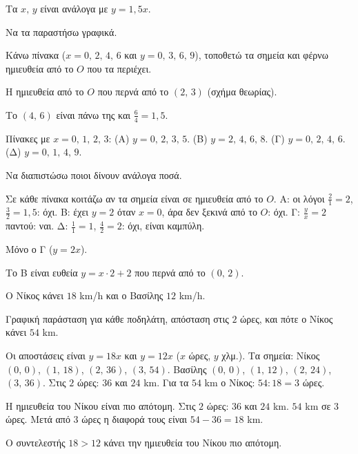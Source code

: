 
\tixero Τα $x,\,y$ είναι ανάλογα με $y=1{,}5x$.\par
\tithelo Να τα παραστήσω γραφικά.\par
\possindeo Κάνω πίνακα ($x=0,\,2,\,4,\,6$ και $y=0,\,3,\,6,\,9$), τοποθετώ τα σημεία και φέρνω ημιευθεία από το $O$ που τα περιέχει.\par
\apantisi Η ημιευθεία από το $O$ που περνά από το $(2,\,3)$ (σχήμα θεωρίας).\par
\elegxos Το $(4,\,6)$ είναι πάνω της και $\frac{6}{4}=1{,}5$.

\tixero Πίνακες με $x=0,\,1,\,2,\,3$: (Α) $y=0,\,2,\,3,\,5$. (Β) $y=2,\,4,\,6,\,8$. (Γ) $y=0,\,2,\,4,\,6$. (Δ) $y=0,\,1,\,4,\,9$.\par
\tithelo Να διαπιστώσω ποιοι δίνουν ανάλογα ποσά.\par
\possindeo Σε κάθε πίνακα κοιτάζω αν τα σημεία είναι σε ημιευθεία από το $O$. Α: οι λόγοι $\frac{2}{1}=2$, $\frac{3}{2}=1{,}5$: όχι. Β: έχει $y=2$ όταν $x=0$, άρα δεν ξεκινά από το $O$: όχι. Γ: $\frac{y}{x}=2$ παντού: ναι. Δ: $\frac{1}{1}=1$, $\frac{4}{2}=2$: όχι, είναι καμπύλη.\par
\apantisi Μόνο ο Γ ($y=2x$).\par
\elegxos Το Β είναι ευθεία $y=x\cdot2+2$ που περνά από το $(0,\,2)$.

\tixero Ο Νίκος κάνει $18$ km/h και ο Βασίλης $12$ km/h.\par
\tithelo Γραφική παράσταση για κάθε ποδηλάτη, απόσταση στις $2$ ώρες, και πότε ο Νίκος κάνει $54$ km.\par
\possindeo Οι αποστάσεις είναι $y=18x$ και $y=12x$ ($x$ ώρες, $y$ χλμ.). Τα σημεία: Νίκος $(0,\,0)$, $(1,\,18)$, $(2,\,36)$, $(3,\,54)$. Βασίλης $(0,\,0)$, $(1,\,12)$, $(2,\,24)$, $(3,\,36)$. Στις $2$ ώρες: $36$ και $24$ km. Για τα $54$ km ο Νίκος: $54:18=3$ ώρες.\par
\apantisi Η ημιευθεία του Νίκου είναι πιο απότομη. Στις $2$ ώρες: $36$ και $24$ km. $54$ km σε $3$ ώρες. Μετά από $3$ ώρες η διαφορά τους είναι $54-36=18$ km.\par
\elegxos Ο συντελεστής $18>12$ κάνει την ημιευθεία του Νίκου πιο απότομη.

\begin{center}
\end{center}

